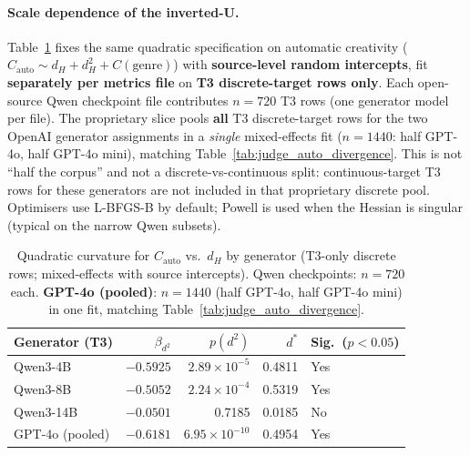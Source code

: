 \documentclass[sigconf,nonacm]{acmart}
\begin{document}
\paragraph{Scale dependence of the inverted-U.}
Table~\ref{tab:scale_regression} fixes the same quadratic specification on automatic creativity ($C_{\mathrm{auto}}\sim d_H+d_H^2+C(\mathrm{genre})$) with \textbf{source-level random intercepts}, fit \textbf{separately per metrics file} on \textbf{T3 discrete-target rows only}.
Each open-source Qwen checkpoint file contributes $n{=}720$ T3 rows (one generator model per file).
The proprietary slice pools \textbf{all} T3 discrete-target rows for the two OpenAI generator assignments in a \emph{single} mixed-effects fit ($n{=}1440$: half GPT-4o, half GPT-4o mini), matching Table~\ref{tab:judge_auto_divergence}. This is not ``half the corpus'' and not a discrete-vs-continuous split: continuous-target T3 rows for these generators are not included in that proprietary discrete pool.
Optimisers use L-BFGS-B by default; Powell is used when the Hessian is singular (typical on the narrow Qwen subsets).

\begin{table}[t]
\centering
\small
\begin{tabular}{lrrrl}
\toprule
Generator (T3) & $\beta_{d^2}$ & $p(d^2)$ & $d^\ast$ & Sig.\ ($p{<}0.05$) \\
\midrule
Qwen3-4B & $-0.5925$ & $2.89{\times}10^{-5}$ & 0.4811 & Yes \\
Qwen3-8B & $-0.5052$ & $2.24{\times}10^{-4}$ & 0.5319 & Yes \\
Qwen3-14B & $-0.0501$ & 0.7185 & 0.0185 & No \\
GPT-4o (pooled) & $-0.6181$ & $6.95{\times}10^{-10}$ & 0.4954 & Yes \\
\bottomrule
\end{tabular}
\caption{Quadratic curvature for $C_{\mathrm{auto}}$ vs.\ $d_H$ by generator (T3-only discrete rows; mixed-effects with source intercepts). Qwen checkpoints: $n{=}720$ each. \textbf{GPT-4o (pooled)}: $n{=}1440$ (half GPT-4o, half GPT-4o mini) in one fit, matching Table~\ref{tab:judge_auto_divergence}.}
\label{tab:scale_regression}
\end{table}
\end{document}
